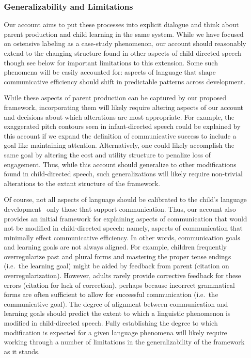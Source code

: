 \documentclass[english,,man,floatsintext]{apa6}
\begin{document}
\hypertarget{generalizability-and-limitations}{%
\subsubsection{Generalizability and Limitations}\label{generalizability-and-limitations}}

Our account aims to put these processes into explicit dialogue and think about parent production and child learning in the same system. While we have focused on ostensive labeling as a case-study phenomenon, our account should reasonably extend to the changing structure found in other aspects of child-directed speech-- though see below for important limitations to this extension. Some such phenomena will be easily accounted for: aspects of language that shape communicative efficiency should shift in predictable patterns across development.

While these aspects of parent production can be captured by our proposed framework, incorporating them will likely require altering aspects of our account and decisions about which alterations are most appropriate. For example, the exaggerated pitch contours seen in infant-directed speech could be explained by this account if we expand the definition of communicative success to include a goal like maintaining attention. Alternatively, one could likely accomplish the same goal by altering the cost and utility structure to penalize loss of engagement. Thus, while this account should generalize to other modifications found in child-directed speech, such generalizations will likely require non-trivial alterations to the extant structure of the framework.

Of course, not all aspects of language should be calibrated to the child's language development-- only those that support communication. Thus, our account also provides an initial framework for explaining aspects of communication that would not be modified in child-directed speech: namely, aspects of communication that minimally effect communicative efficiency. In other words, communication goals and learning goals are not always aligned. For example, children frequently overregularize past and plural forms and mastering the proper tense endings (i.e.~the learning goal) might be aided by feedback from parent (citation on overregularization). However, adults rarely provide corrective feedback for these errors (citation for lack of correction), perhaps because incorrect grammatical forms are often sufficient to allow for successful communication (i.e.~the communicative goal). The degree of alignment between communication and learning goals should predict the extent to which a linguistic phenomenon is modified in child-directed speech. Fully establishing the degree to which modification is expected for a given language phenomena will likely require working through a number of limitations in the generalizability of the framework as it stands.
\end{document}
